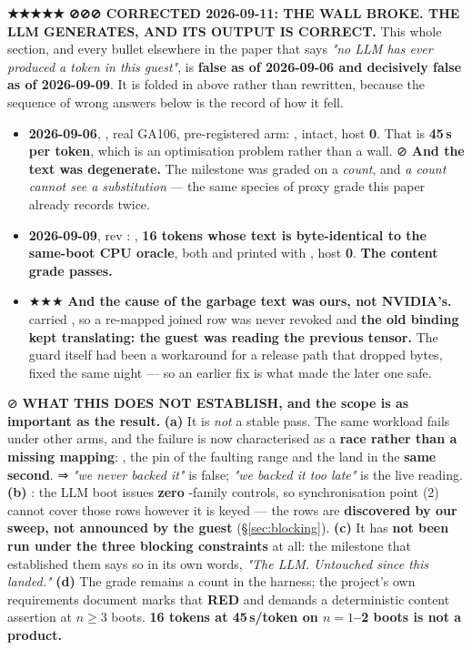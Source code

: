 \documentclass[10.5pt]{article}
\begin{document}
\begin{warnbox}\small
\textbf{★★★★★ ⊘⊘⊘ CORRECTED 2026-09-11: THE WALL BROKE. THE LLM GENERATES, AND ITS OUTPUT IS
CORRECT.} This whole section, and every bullet elsewhere in the paper that says \emph{"no LLM has
ever produced a token in this guest"}, is \textbf{false as of 2026-09-06 and decisively false as
of 2026-09-09}. It is folded in above rather than rewritten, because the sequence of wrong
answers below is the record of how it fell.

\smallskip
\begin{itemize}\small
\item \measured{} \textbf{2026-09-06}, , real GA106, pre-registered arm:
  ,  intact, host
   \textbf{0}. That is \textbf{45\,s per token}, which is an optimisation problem rather
  than a wall. ⊘ \textbf{And the text was degenerate.} The milestone was graded on a
  \emph{count}, and \emph{a count cannot see a substitution} --- the same species of proxy grade
  this paper already records twice.
\item \measured{} \textbf{2026-09-09}, rev : , \textbf{16
  tokens whose text is byte-identical to the same-boot CPU oracle}, both 
  and  printed with , host  \textbf{0}. \textbf{The content grade
  passes.}
\item ★★★ \textbf{And the cause of the garbage text was ours, not NVIDIA's.} 
  carried , so a re-mapped joined row was never revoked
  and \textbf{the old binding kept translating: the guest was reading the previous tensor.} The
  guard itself had been a workaround for a release path that dropped bytes, fixed the same night
  --- so an earlier fix is what made the later one safe.
\end{itemize}

\smallskip
⊘ \textbf{WHAT THIS DOES NOT ESTABLISH, and the scope is as important as the result.}
\textbf{(a)} It is \emph{not} a stable pass. The same workload fails under other arms, and the
failure is now characterised as a \textbf{race rather than a missing mapping}: \measured{}
, the pin of the faulting range and the 
land in the \textbf{same second}. ⇒ \emph{"we never backed it"} is false; \emph{"we backed it too
late"} is the live reading. \textbf{(b)} \measured{} : the LLM boot issues
\textbf{zero} -family controls, so synchronisation point (2) cannot cover
those rows however it is keyed --- the rows are \textbf{discovered by our sweep, not announced by
the guest} (\S\ref{sec:blocking}). \textbf{(c)} It has \textbf{not been run under the three
blocking constraints} at all: the milestone that established them says so in its own words,
\emph{"The LLM. Untouched since this landed."} \textbf{(d)} The grade remains a count in the
harness; the project's own requirements document marks that \textbf{RED} and demands a
deterministic content assertion at $n \geq 3$ boots. \textbf{16 tokens at 45\,s/token on
$n = 1$--2 boots is not a product.}


\end{warnbox}
\end{document}
